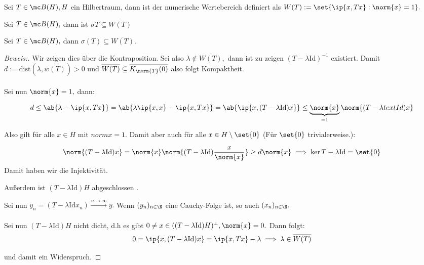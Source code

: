\begin{definition} Sei $T \in \mc B(H), H$ ein Hilbertraum, dann ist der numerische Wertebereich definiert als $W(T) := \set{\ip{x, Tx}: \norm{x} = 1}.$ 
	
\end{definition}


\begin{theorem} Sei $T \in \mc B(H),$ dann ist $\sigma{T} \subseteq \overline{W(T)}$
	
\end{theorem}


\begin{theorem} \label{num_spec} Sei $T \in \mc B(H),$ dann $\sigma(T) \subseteq \overline{W(T)}.$
	
	\begin{proof}[Beweis:] Wir zeigen dies über die Kontraposition. Sei also $\lambda \notin \overline{W(T)},$ dann ist zu zeigen $(T-\lambda\text{Id})^{-1}$ existiert. Damit $d := \text{dist}(\lambda, \overline{w(T)}) > 0$ und $\overline{W(T)} \subseteq \overline{K_{\norm{T}}(0)}$ also folgt Kompaktheit. \\ \\
		
		Sei nun $\norm{x} = 1,$ dann:
		
		\[d \leq \ab{\lambda - \ip{x, Tx}} = \ab{\lambda \ip{x, x} - \ip{x, Tx}} = \ab{\ip{x, (T-\lambda \text{Id})x}} \leq \underbrace{\norm{x}}_{= 1} \norm{(T-\lambda{text{Id}})x}\]
		
		Also gilt für alle $x \in H$ mit $norm{x} = 1.$ Damit aber auch für alle $x \in H\setminus \set{0}$ (Für $\set{0}$ trivialerweise.): \[\]
		
		\[\norm{(T-\lambda \text{Id})x} = \norm{x} \norm{(T-\lambda \text{Id})\frac{x}{\norm{x}}} \geq d \norm{x} \implies \ker{T - \lambda \text{Id}} = \set{0}\] Damit haben wir die Injektivität. %
		
		Außerdem ist $(T- \lambda \text{Id})H$ abgeschlossen .
		
		Sei nun $y_n = (T-\lambda \text{Id}x_n) \xrightarrow{n \to \infty} y.$ Wenn $(y_n)_{n \in \N}$ eine Cauchy-Folge ist, so auch $(x_n)_{n \in \N}.$ \\ \\
		
		Sei nun $(T- \lambda \text{Id})H$ nicht dicht, d.h es gibt $0 \not= x \in ((T-\lambda \text{Id})H)^{\perp}, \norm{x} = 0.$ Dann folgt: \[0 = \ip{x, (T- \lambda \text{Id})x} = \ip{x, Tx}-\lambda \implies \lambda \in \overline{W(T)}\]
		
		und damit ein Widerspruch. 
		
	\end{proof}
	
\end{theorem}


